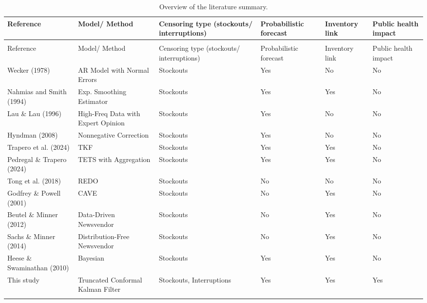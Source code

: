 \documentclass[
  11pt,
  authoryear,
  doubleblind,
  3p]{elsarticle}
\begin{document}
\begin{longtable}[t]{>{\raggedright\arraybackslash}p{8em}>{\raggedright\arraybackslash}p{12em}>{\raggedright\arraybackslash}p{12em}>{\raggedright\arraybackslash}p{12em}>{\raggedright\arraybackslash}p{12em}>{\raggedright\arraybackslash}p{8em}}

\caption{\label{tbl-literature_wp2}Overview of the literature summary.}

\tabularnewline

\toprule
Reference & Model/ Method & Censoring type (stockouts/ interruptions) & Probabilistic forecast & Inventory link & Public health impact\\
\midrule
\endfirsthead
\multicolumn{6}{@{}l}{\textit{(continued)}}\\
\toprule
Reference & Model/ Method & Censoring type (stockouts/ interruptions) & Probabilistic forecast & Inventory link & Public health impact\\
\midrule
\endhead

\endfoot
\bottomrule
\endlastfoot
Wecker (1978) & AR Model with Normal Errors & Stockouts & Yes & No & No\\
Nahmias and Smith (1994) & Exp. Smoothing Estimator & Stockouts & Yes & Yes & No\\
Lau \& Lau (1996) & High-Freq Data with Expert Opinion & Stockouts & Yes & No & No\\
Hyndman (2008) & Nonnegative Correction & Stockouts & Yes & No & No\\
Trapero et al. (2024) & TKF & Stockouts & Yes & Yes & No\\
\addlinespace
Pedregal \& Trapero (2024) & TETS with Aggregation & Stockouts & Yes & Yes & No\\
Tong et al. (2018) & REDO & Stockouts & No & No & No\\
Godfrey \& Powell (2001) & CAVE & Stockouts & No & Yes & No\\
Beutel \& Minner (2012) & Data-Driven Newsvendor & Stockouts & No & Yes & No\\
Sachs \& Minner (2014) & Distribution-Free Newsvendor & Stockouts & No & Yes & No\\
\addlinespace
Heese \& Swaminathan (2010) & Bayesian & Stockouts & Yes & Yes & No\\
This study & Truncated Conformal Kalman Filter & Stockouts, Interruptions & Yes & Yes & Yes\\*

\end{longtable}
\end{document}
